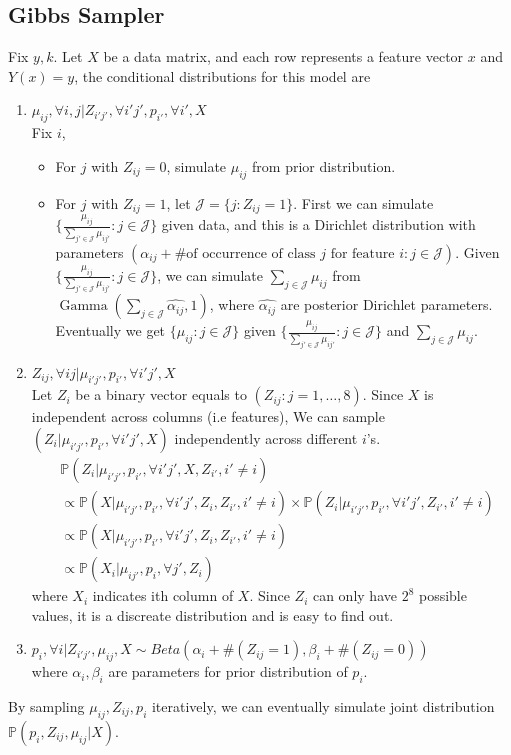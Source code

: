 \documentclass[12pt]{article}
\DeclareMathOperator{\Gam}{Gamma}
\begin{document}
\subsection{Gibbs Sampler}
Fix $y,k$. Let $X$ be a data matrix, and each row represents a feature vector $x$ and $Y(x)=y$, the conditional distributions for this model are
\begin{enumerate}
    \item
    $\mu_{ij}, \forall i,j | Z_{i'j'}, \forall i'j', p_{i'}, \forall i', X$\\
    Fix $i$, \begin{itemize}
 \item
 For $j$ with $Z_{ij}=0$, simulate $\mu_{ij}$ from prior distribution.
 \item
 For $j$ with $Z_{ij}=1$, let $\mathcal{J}=\{j: Z_{ij}=1\}$. First we can simulate $\{\frac{\mu_{ij}}{\sum_{j' \in \mathcal{J}} \mu_{ij'}} : j \in \mathcal{J}\}$ given data, and this is a Dirichlet distribution with parameters $(\alpha_{ij}+\text{\# of occurrence of class $j$ for feature $i$} : j \in \mathcal{J})$. Given $\{\frac{\mu_{ij}}{\sum_{j' \in \mathcal{J}} \mu_{ij'}} : j \in \mathcal{J}\}$, we can simulate $\sum_{j \in \mathcal{J}} \mu_{ij}$ from $\Gam(\sum_{j \in \mathcal{J}} \hat{\alpha_{ij}},1)$, where $\hat{\alpha_{ij}}$ are posterior Dirichlet parameters. Eventually we get $\{\mu_{ij}:j \in \mathcal{J}\}$ given $\{\frac{\mu_{ij}}{\sum_{j' \in \mathcal{J}} \mu_{ij'}} : j \in \mathcal{J}\}$ and $\sum_{j \in \mathcal{J}} \mu_{ij}$. 
 \end{itemize}
    \item
    $Z_{ij}, \forall ij | \mu_{i'j'}, p_{i'}, \forall i'j', X$ \\
    Let $Z_i$ be a binary vector equals to $(Z_{ij} : j=1,\ldots, 8)$. Since $X$ is independent across columns (i.e features), We can sample $(Z_i | \mu_{i'j'}, p_{i'}, \forall i'j', X)$ independently across different $i$'s. 
    \begin{align*}
    &\mathbb{P} (Z_i | \mu_{i'j'}, p_{i'}, \forall i'j', X, Z_{i'}, i' \neq i) \\
    &\propto \mathbb{P} (X | \mu_{i'j'}, p_{i'}, \forall i'j', Z_i, Z_{i'}, i' \neq i) \times \mathbb{P} (Z_i | \mu_{i'j'}, p_{i'}, \forall i'j', Z_{i'}, i' \neq i)\\
    &\propto \mathbb{P} (X | \mu_{i'j'}, p_{i'}, \forall i'j', Z_i, Z_{i'}, i' \neq i) \\
    &\propto \mathbb{P} (X_i | \mu_{ij'}, p_{i}, \forall j', Z_i)
    \end{align*}
    where $X_i$ indicates ith column of $X$. Since $Z_i$ can only have $2^8$ possible values, it is a discreate distribution and is easy to find out.
    \item
    $p_i, \forall i | Z_{i'j'}, \mu_{ij}, X \sim Beta(\alpha_i + \# (Z_{ij}=1), \beta_i + \# (Z_{ij}=0) )$\\
    where $\alpha_i, \beta_i$ are parameters for prior distribution of $p_i$.
\end{enumerate}

By sampling $\mu_{ij}, Z_{ij}, p_i$ iteratively, we can eventually simulate joint distribution $\mathbb{P} (p_i, Z_{ij}, \mu_{ij} | X)$.
\end{document}
